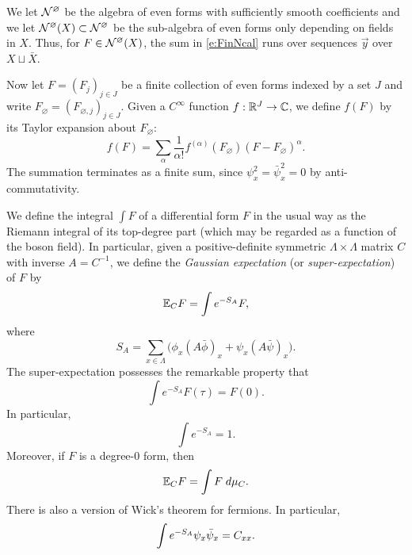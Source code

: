 We let $\mathcal{N}^\varnothing$ be the algebra of even forms with sufficiently smooth coefficients
and we let $\mathcal{N}^\varnothing(X) \subset \mathcal{N}^\varnothing$ be the sub-algebra of even forms only depending on fields
in $X$. Thus, for $F \in \mathcal{N}^\varnothing(X)$, the sum in \eqref{e:FinNcal} runs over sequences $\vec y$
over $X \sqcup \bar X$.

Now let $F = (F_j)_{j \in J}$ be a finite collection of even forms
indexed by a set $J$
and write $F_\varnothing = (F_{\varnothing,j})_{j \in J}$.
Given a $C^\infty$ function $f : {\mathbb R}^J \rightarrow \mathbb{C}$, we define
$f(F)$ by its Taylor expansion about $F_\varnothing$:
\begin{equation}
f(F) = \sum_\alpha \frac{1}{\alpha!} f^{(\alpha)}(F_\varnothing) (F - F_\varnothing)^\alpha.
\end{equation}
The summation terminates as a finite sum,
since $\psi_x^2 = \bar\psi_x^2 = 0$
by anti-commutativity.

We define the integral $\int F$ of a differential form $F$ in the usual way
as the Riemann integral of its top-degree part (which may be regarded as a function
of the boson field).
In particular, given a positive-definite symmetric
$\Lambda \times \Lambda$ matrix $C$ with inverse $A = C^{-1}$,
we define the \emph{Gaussian expectation} (or \emph{super-expectation}) of $F$ by
\begin{equation}
\lbeq{ExCF}
\Ex_C F = \int e^{-S_A} F,
\end{equation}
where
\begin{equation}
\label{e:action}
S_A = \sum_{x\in\Lambda} \Big(\phi_x (A\bar\phi)_x + \psi_x (A \bar\psi)_x\Big).
\end{equation}
The super-expectation possesses the remarkable property that
\begin{equation}
\label{e:tau-iso}
\int e^{-S_A} F(\tau) = F(0).
\end{equation}
In particular,
\begin{equation}
\label{e:self-normal}
\int e^{-S_A} = 1.
\end{equation}
Moreover, if $F$ is a degree-$0$ form, then
\begin{equation}
\mathbb{E}_C F = \int F \; d\mu_C.
\end{equation}
There is also a version of Wick's theorem for fermions. In particular,
\begin{equation}
\label{e:wick-fermion2}
\int e^{-S_A} \psi_x \bar\psi_x = C_{xx}.
\end{equation}

